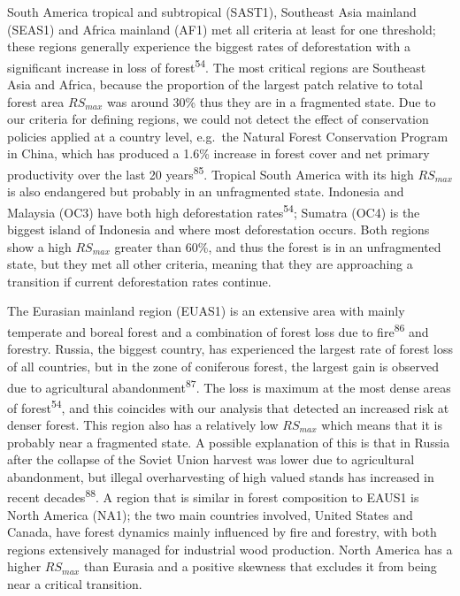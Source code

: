 \documentclass[]{article}
\begin{document}
South America tropical and subtropical (SAST1), Southeast Asia mainland
(SEAS1) and Africa mainland (AF1) met all criteria at least for one
threshold; these regions generally experience the biggest rates of
deforestation with a significant increase in loss of
forest\textsuperscript{54}. The most critical regions are Southeast Asia
and Africa, because the proportion of the largest patch relative to
total forest area \(RS_{max}\) was around 30\% thus they are in a
fragmented state. Due to our criteria for defining regions, we could not
detect the effect of conservation policies applied at a country level,
e.g.~the Natural Forest Conservation Program in China, which has
produced a 1.6\% increase in forest cover and net primary productivity
over the last 20 years\textsuperscript{85}. Tropical South America with
its high \(RS_{max}\) is also endangered but probably in an unfragmented
state. Indonesia and Malaysia (OC3) have both high deforestation
rates\textsuperscript{54}; Sumatra (OC4) is the biggest island of
Indonesia and where most deforestation occurs. Both regions show a high
\(RS_{max}\) greater than 60\%, and thus the forest is in an
unfragmented state, but they met all other criteria, meaning that they
are approaching a transition if current deforestation rates continue.

The Eurasian mainland region (EUAS1) is an extensive area with mainly
temperate and boreal forest and a combination of forest loss due to
fire\textsuperscript{86} and forestry. Russia, the biggest country, has
experienced the largest rate of forest loss of all countries, but in the
zone of coniferous forest, the largest gain is observed due to
agricultural abandonment\textsuperscript{87}. The loss is maximum at the
most dense areas of forest\textsuperscript{54}, and this coincides with
our analysis that detected an increased risk at denser forest. This
region also has a relatively low \(RS_{max}\) which means that it is
probably near a fragmented state. A possible explanation of this is that
in Russia after the collapse of the Soviet Union harvest was lower due
to agricultural abandonment, but illegal overharvesting of high valued
stands has increased in recent decades\textsuperscript{88}. A region
that is similar in forest composition to EAUS1 is North America (NA1);
the two main countries involved, United States and Canada, have forest
dynamics mainly influenced by fire and forestry, with both regions
extensively managed for industrial wood production. North America has a
higher \(RS_{max}\) than Eurasia and a positive skewness that excludes
it from being near a critical transition.
\end{document}
